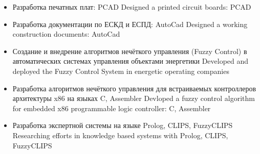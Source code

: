 \documentclass[11pt,a4paper,sans, russian]{moderncv}        %
\begin{document}
{\begin{itemize}
		{Разработка электрических принципиальных схем: PCAD}
		{Designed a schematic circuit diagrams: PCAD}
	\item {}
		{Разработка печатных плат: PCAD}
		{Designed a printed circuit boards: PCAD}
	\item {}
		{Разработка документации по ЕСКД и ЕСПД: AutoCad}
		{Designed a working construction documents: AutoCad}
	\item {}
		{Создание и внедрение алгоритмов нечёткого управления (Fuzzy Control) в автоматических системах управления объектами энергетики}
		{Developed and deployed the Fuzzy Control System in energetic operating companies}
	\item {}
		{Разработка алгоритмов нечёткого управления для встраиваемых контроллеров архитектуры x86 на языках C, Assembler}
		{Devloped a fuzzy control algorithm for embedded x86 programmable logic controller: C, Assembler}
	\item {}
		{Разработка экспертной системы на языке Prolog, CLIPS, FuzzyCLIPS}
		{Researching efforts in knowledge based systems with Prolog, CLIPS, FuzzyCLIPS}	
\end{itemize}
}

\pagebreak


{}
{}
{}
{}

\end{document}
